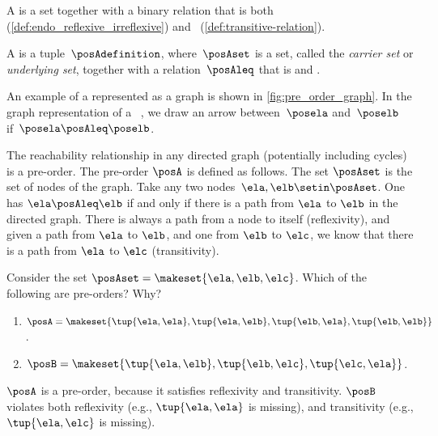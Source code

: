 A  is a set together with a binary relation that is both  (\cref{def:endo_reflexive_irreflexive}) and ~(\cref{def:transitive-relation}).
\begin{ctdefinition}
    \label{def:preorder}
    A  is a tuple~$\posAdefinition$, where~$\posAset$ is a set, called the \emph{carrier set} or \emph{underlying set}, together with a relation~$\posAleq$ that is
     and .
\end{ctdefinition}
An example of a  represented as a graph is shown in \cref{fig:pre_order_graph}.
In the graph representation of a ~\posA, we draw an arrow between~$\posela$ and~$\poselb$ if~$\posela \posAleq \poselb$.

\begin{example}
    The reachability relationship in any directed graph (potentially including cycles) is a pre-order.
    The pre-order $\posA$ is defined as follows.
    The set $\posAset$ is the set of nodes of the graph.
    Take any two nodes~$\ela,\elb \setin \posAset$.
    One has $\ela \posAleq \elb$ if and only if there is a path from $\ela$ to $\elb$ in the directed graph.
    There is always a path from a node to itself (reflexivity), and given a path from $\ela$ to $\elb$, and one from $\elb$ to $\elc$, we know that there is a path from $\ela$ to $\elc$ (transitivity).
\end{example}

\begin{exercise}
    \label{ex:findpreorders}
    Consider the set $\posAset=\makeset{\ela,\elb,\elc}$.
    Which of the following are pre-orders? Why?
    \begin{enumerate}
        \item $\posA= \makeset{\tup{\ela,\ela},\tup{\ela,\elb},\tup{\elb,\ela},\tup{\elb,\elb}}$.
        \item $\posB= \makeset{\tup{\ela,\elb},\tup{\elb,\elc},\tup{\elc,\ela}}$.
    \end{enumerate}
\end{exercise}

\begin{solution}
    $\posA$ is a pre-order, because it satisfies reflexivity and transitivity.
    $\posB$ violates both reflexivity (e.g., $\tup{\ela,\ela}$ is missing), and transitivity (e.g., $\tup{\ela,\elc}$ is missing).
\end{solution}

